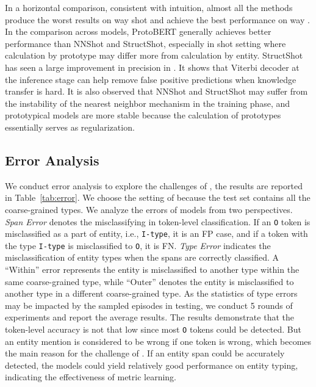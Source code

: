 \documentclass[11pt,a4paper, dvipsnames]{article}
\begin{document}
In a horizontal comparison, consistent with intuition, almost all the methods produce the worst results on  way  shot and achieve the best performance on  way . 
In the comparison across models, ProtoBERT generally achieves better performance than NNShot and StructShot, especially in  shot setting where calculation by prototype may differ more from calculation by entity. StructShot has seen a large improvement in precision in . It shows that Viterbi decoder at the inference stage can help remove false positive predictions when knowledge transfer is hard. It is also observed that NNShot and StructShot may suffer from the instability of the nearest neighbor mechanism in the training phase, and prototypical models are more stable because the calculation of prototypes essentially serves as regularization.


\subsection{Error Analysis}
\vspace{-0.1cm}

We conduct error analysis to explore the challenges of , the results are reported in Table~\ref{tab:error}. We choose the setting of  because the test set contains all the coarse-grained types. We analyze the errors of models from two perspectives. \textit{Span Error} denotes the misclassifying in token-level classification. If an \texttt{O} token is misclassified as a part of entity, i.e., \texttt{I-type}, it is an FP case, and if a token with the type \texttt{I-type} is misclassified to \texttt{O}, it is FN. \textit{Type Error} indicates the misclassification of entity types when the spans are correctly classified. A ``Within'' error represents the entity is misclassified to another type within the same coarse-grained type, while ``Outer'' denotes the entity is misclassified to another type in a different coarse-grained type. As the statistics of type errors may be impacted by the sampled episodes in testing, we conduct 5 rounds of experiments and report the average results.
The results demonstrate that the token-level accuracy is not that low since most \texttt{O} tokens could be detected. But an entity mention is considered to be wrong if one token is wrong, which becomes the main reason for the challenge of . If an entity span could be accurately detected, the models could yield relatively good performance on entity typing, indicating the effectiveness of metric learning. 
\end{document}
